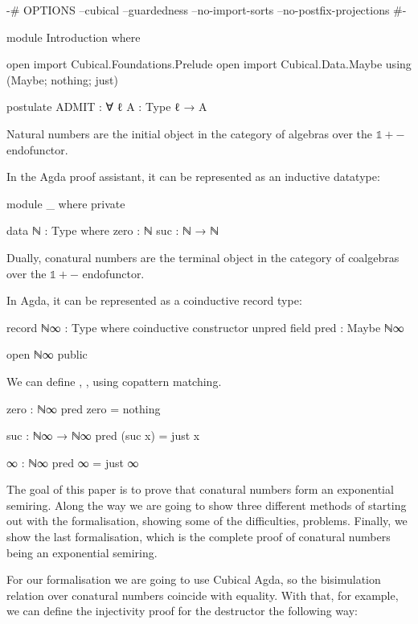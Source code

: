 \begin{code}[hide]
{-# OPTIONS --cubical --guardedness --no-import-sorts --no-postfix-projections #-}

module Introduction where

open import Cubical.Foundations.Prelude
open import Cubical.Data.Maybe using (Maybe; nothing; just)

postulate
  ADMIT : ∀ {ℓ} {A : Type ℓ} → A
\end{code}
Natural numbers are the initial object in the category of algebras over the
$\mathbb{1} + {-}$ endofunctor.

In the Agda proof assistant, it can be represented as an inductive datatype:

\begin{code}[hide]
module _ where private
\end{code}
\begin{code}
  data ℕ : Type where
    zero  : ℕ
    suc   : ℕ → ℕ
\end{code}

Dually, conatural numbers are the terminal object in the category of coalgebras
over the $\mathbb{1} + {-}$ endofunctor.

In Agda, it can be represented as a coinductive record type:

\begin{code}
record ℕ∞ : Type where
  coinductive
  constructor unpred
  field
    pred : Maybe ℕ∞
\end{code}
\begin{code}[hide]
open ℕ∞ public
\end{code}

We can define , ,  using copattern matching.

\begin{code}
zero : ℕ∞
pred zero = nothing

suc : ℕ∞ → ℕ∞
pred (suc x) = just x

∞ : ℕ∞
pred ∞ = just ∞
\end{code}

The goal of this paper is to prove that conatural numbers form an exponential semiring. Along the way we are going to show three different methods of starting out with the formalisation, showing some of the difficulties, problems. Finally, we show the last formalisation, which is the complete proof of conatural numbers being an exponential semiring.

For our formalisation we are going to use Cubical Agda, so the bisimulation relation over conatural numbers coincide with equality. With that, for example, we can define the injectivity proof for the  destructor the following way:

